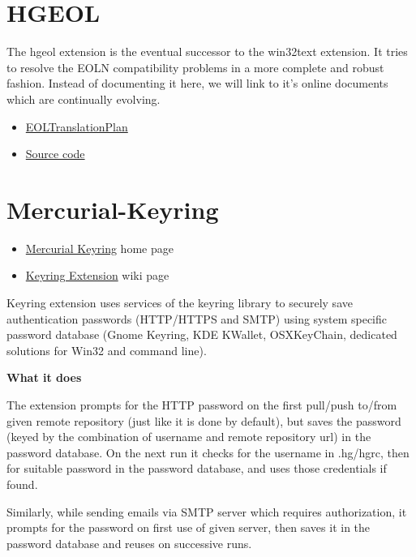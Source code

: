 \documentclass[letterpaper,10pt,english]{manual}
\begin{document}
\section{HGEOL}

The hgeol extension is the eventual successor to the win32text
extension.  It tries to resolve the EOLN compatibility problems in a
more complete and robust fashion.  Instead of documenting it here, we
will link to it's online documents which are continually evolving.
\begin{itemize}
\item {} 
\href{http://mercurial.selenic.com/wiki/EOLTranslationPlan}{EOLTranslationPlan}

\item {} 
\href{http://bitbucket.org/mg/hg-eol/}{Source code}

\end{itemize}


\section{Mercurial-Keyring}
\begin{itemize}
\item {} 
\href{http://pypi.python.org/pypi/mercurial\_keyring}{Mercurial Keyring} home page

\item {} 
\href{http://mercurial.selenic.com/wiki/KeyringExtension}{Keyring Extension} wiki page

\end{itemize}

Keyring extension uses services of the keyring library to securely save
authentication passwords (HTTP/HTTPS and SMTP) using system specific
password database (Gnome Keyring, KDE KWallet, OSXKeyChain, dedicated
solutions for Win32 and command line).

\textbf{What it does}

The extension prompts for the HTTP password on the first pull/push
to/from given remote repository (just like it is done by default), but
saves the password (keyed by the combination of username and remote
repository url) in the password database. On the next run it checks for
the username in .hg/hgrc, then for suitable password in the password
database, and uses those credentials if found.

Similarly, while sending emails via SMTP server which requires
authorization, it prompts for the password on first use of given server,
then saves it in the password database and reuses on successive runs.
\end{document}
